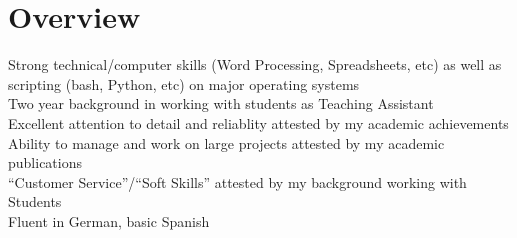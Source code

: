 \documentclass[letterpaper,11pt]{article}
\makeatletter
\newcommand{\resumeItem}[1]{
  \item{
    {#1 \vspace{-4pt}}
  }
}
\newcommand{\resumeSubheading}[4]{
  \vspace{-5pt}\item
    \begin{tabular*}{0.97\textwidth}[t]{l@{\extracolsep{\fill}}r}
      \textbf{#1} & #2 \\
    \end{tabular*}\vspace{-10pt}
}
\newcommand{\resumeSubHeadingListStart}{\vspace{1pt}\begin{itemize}[leftmargin=0.15in, label={}]}
\newcommand{\resumeSubHeadingListEnd}{\end{itemize}}
\newcommand{\resumeItemListStart}{\begin{itemize}}
\newcommand{\resumeItemListEnd}{\end{itemize}\vspace{-5pt}}
\makeatother
\begin{document}
% 


\section{Overview}
\begin{itemize}[leftmargin=0.15in, label={}]
    \normalsize{\item{
        Strong technical/computer skills (Word Processing, Spreadsheets, etc) as well as scripting (bash, Python, etc) on major operating systems\\
        Two year background in working with students as Teaching Assistant\\
        Excellent attention to detail and reliablity attested by my academic achievements\\
        Ability to manage and work on large projects attested by my academic publications\\
        ``Customer Service''/``Soft Skills'' attested by my background working with Students\\
        Fluent in German, basic Spanish \\
        }}    
\end{itemize}   
\end{document}

